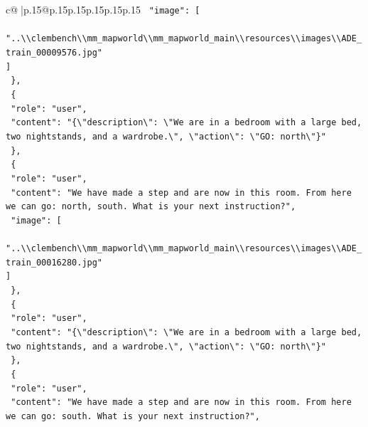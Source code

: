 \documentclass{article}
\begin{document}
{\begin{supertabular}{c@{$\;$}|p{.15\linewidth}@{}p{.15\linewidth}p{.15\linewidth}p{.15\linewidth}p{.15\linewidth}p{.15\linewidth}}
{{{\texttt{    "image": {[}} \\
\texttt{      "..\textbackslash{}\textbackslash{}clembench\textbackslash{}\textbackslash{}mm\_mapworld\textbackslash{}\textbackslash{}mm\_mapworld\_main\textbackslash{}\textbackslash{}resources\textbackslash{}\textbackslash{}images\textbackslash{}\textbackslash{}ADE\_train\_00009576.jpg"} \\
\texttt{    {]}} \\
\texttt{  \},} \\
\texttt{  \{} \\
\texttt{    "role": "user",} \\
\texttt{    "content": "\{\textbackslash{}"description\textbackslash{}": \textbackslash{}"We are in a bedroom with a large bed, two nightstands, and a wardrobe.\textbackslash{}", \textbackslash{}"action\textbackslash{}": \textbackslash{}"GO: north\textbackslash{}"\}"} \\
\texttt{  \},} \\
\texttt{  \{} \\
\texttt{    "role": "user",} \\
\texttt{    "content": "We have made a step and are now in this room. From here we can go: north, south. What is your next instruction?",} \\
\texttt{    "image": {[}} \\
\texttt{      "..\textbackslash{}\textbackslash{}clembench\textbackslash{}\textbackslash{}mm\_mapworld\textbackslash{}\textbackslash{}mm\_mapworld\_main\textbackslash{}\textbackslash{}resources\textbackslash{}\textbackslash{}images\textbackslash{}\textbackslash{}ADE\_train\_00016280.jpg"} \\
\texttt{    {]}} \\
\texttt{  \},} \\
\texttt{  \{} \\
\texttt{    "role": "user",} \\
\texttt{    "content": "\{\textbackslash{}"description\textbackslash{}": \textbackslash{}"We are in a bedroom with a large bed, two nightstands, and a wardrobe.\textbackslash{}", \textbackslash{}"action\textbackslash{}": \textbackslash{}"GO: north\textbackslash{}"\}"} \\
\texttt{  \},} \\
\texttt{  \{} \\
\texttt{    "role": "user",} \\
\texttt{    "content": "We have made a step and are now in this room. From here we can go: south. What is your next instruction?",} \\
}}}
\end{supertabular}}
\end{document}
